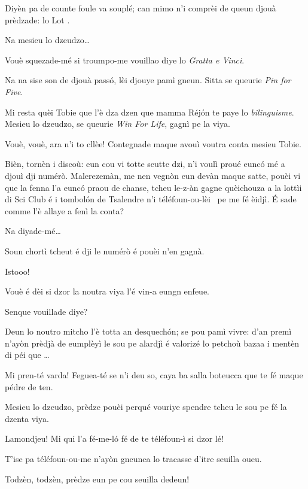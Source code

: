 \begin{drama}
\DzeudzoSenliquerspeaks Diyèn pa de counte foule va souplé; can mimo n’i comprèi de queun djouà prèdzade: lo Lot \lotto.

\Tobiespeaks Na mesieu lo dzeudzo\ldots

\DzeudzoSenliquerspeaks Vouè squezade-mé si troumpo-me vouillao diye lo \textit{Gratta e Vinci}.

\Tobiespeaks Na na sise son de djouà passó, lèi djouye pamì gneun. Sitta se queurie \textit{Pin for Five}.

\Bertinaspeaks Mi resta quèi Tobie que l’è dza dzen que mamma Réjón te paye lo \textit{bilinguisme}.  Mesieu lo dzeudzo, se queurie \textit{Win For Life}, gagnì pe la viya.

\DzeudzoSenliquerspeaks Vouè, vouè, ara n’i to cllèe! Contegnade maque avouì voutra conta mesieu Tobie.

\Tobiespeaks Bièn, tornèn i discoù: eun cou vi totte seutte dzi, n’i voulì proué eunc\'o mé a djouì  dji numérò. Malerezemàn, me nen vegnòn eun devàn maque satte, pouèi vi que la fenna l'a eunc\'o praou de chanse, tcheu le-z-àn gagne quèichouza a la lottìi di Sci Club é i tombol\'on de Tsalendre n’i téléfoun-ou-lèi \chiamare\ pe me fé èidjì. É sade comme l’è allaye a fenì la conta?

\DzeudzoSenliquerspeaks Na diyade-mé\ldots

\Tobiespeaks Soun chortì tcheut é dji le numérò é pouèi n’en gagnà.

\DzeudzoSenliquerspeaks Istooo!

\Bertinaspeaks Vouè é dèi si dzor la noutra viya l’é vin-a eungn enfeue.

\DzeudzoSenliquerspeaks Senque vouillade diye?

\Bertinaspeaks Deun lo noutro mitcho l’è totta an desquechón; se pou pamì vivre: d'an premì n’ayòn prèdjà de eumplèyì le sou pe alardjì é valorizé lo petchoù bazaa i mentèn di péi que \ldots

\Tobiespeaks Mi pren-té varda! Feguea-té se n’i deu so, caya ba salla boteucca que te fé maque pédre de ten.

\Bertinaspeaks Mesieu lo dzeudzo, prèdze pouèi perqué vouriye spendre tcheu le sou pe fé la dzenta viya.

\Tobiespeaks Lamondjeu! Mi qui l'a fé-me-l\'o fé de te téléfoun-ì si dzor lé!

\Bertinaspeaks T'ise pa téléfoun-ou-me n’ayòn gneunca lo tracasse d’itre seuilla oueu.

\DzeudzoSenliquerspeaks {} Todzèn, todzèn, prèdze eun pe cou seuilla dedeun!


\end{drama}
